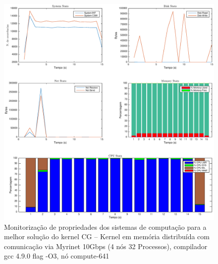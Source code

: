\documentclass[conference,compsoc]{IEEEtran}
\begin{document}
 \begin{figure}
\centering
\includegraphics[width=\textwidth]{EPS/DSTAT/CG_MPI_MX_GCC.eps}
\caption{Monitorização de propriedades dos sistemas de computação para a melhor solução do kernel CG -- Kernel em memória distribuída com comunicação via Myrinet 10Gbps (4 nós 32 Processos), compilador gcc 4.9.0 flag -O3, nó compute-641}
\label{dstat_cg}
\end{figure}
\end{document}
